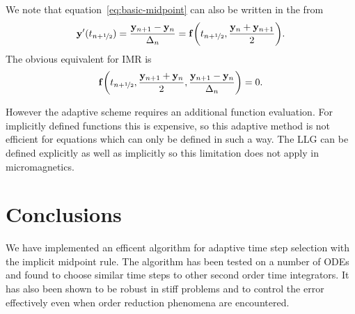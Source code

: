 We note that equation~\eqref{eq:basic-midpoint} can also be written in the from
\begin{equation}
  \mathbf{y}'(t_{n+\nicefrac{1}{2}}) = \frac{\mathbf{y}_{n+1} - \mathbf{y}_n}{\Delta_{n}} =  {\mathbf{f}{\left( t_{n+\nicefrac{1}{2}}, \frac{\mathbf{y}_n + \mathbf{y}_{n+1}}{2} \right)}}.
\end{equation}
The obvious equivalent for IMR is
\begin{equation}
  {\mathbf{f}{\left( t_{n+\nicefrac{1}{2}}, \frac{\mathbf{y}_{n+1} + \mathbf{y}_n}{2}, \frac{\mathbf{y}_{n+1} - \mathbf{y}_n}{\Delta_{n}} \right)}} = 0.
\end{equation}

However the adaptive scheme requires an additional function evaluation.
For implicitly defined functions this is expensive, so this adaptive method is not efficient for equations which can only be defined in such a way.
The LLG can be defined explicitly as well as implicitly so this limitation does not apply in micromagnetics.



\section{Conclusions}

We have implemented an efficent algorithm for adaptive time step selection with the implicit midpoint rule.
The algorithm has been tested on a number of ODEs and found to choose similar time steps to other second order time integrators.
It has also been shown to be robust in stiff problems and to control the error effectively even when order reduction phenomena are encountered.


